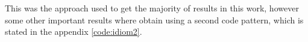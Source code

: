 This was the approach used to get the majority of results in this work, however some other important results where obtain using a second code pattern, which is stated in the appendix \ref{code:idiom2}.

%
%





